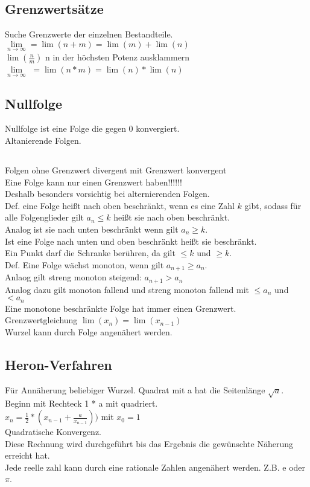 \documentclass{article}
\begin{document}
	\subsection*{Grenzwertsätze}
	Suche Grenzwerte der einzelnen Bestandteile.
	$\lim\limits_{n \to \infty} = \lim(n + m) = \lim(m) + \lim(n)$ \\
	$\lim(\frac{n}{m})$ n in der höchsten Potenz ausklammern \\
	$\lim\limits_{n \to \infty}$ $= \lim(n * m) = \lim(n) * \lim(n)$
	\subsection*{Nullfolge}
	Nullfolge ist eine Folge die gegen $0$ konvergiert. \\
	Altanierende Folgen. \\
	\subsection*{}
	Folgen ohne Grenzwert divergent mit Grenzwert konvergent \\
	Eine Folge kann nur einen Grenzwert haben!!!!!! \\
	Deshalb besonders vorsichtig bei alternierenden Folgen. \\
	Def. eine Folge heißt nach oben beschränkt, wenn es eine Zahl $k$ gibt, sodass für alle Folgenglieder gilt $a_{n} \leq k$ heißt sie nach oben beschränkt. \\ 
	Analog ist sie nach unten beschränkt wenn gilt $a_{n} \geq k$. \\
	 Ist eine Folge nach unten und oben beschränkt heißt sie beschränkt. \\
	Ein Punkt darf die Schranke berühren, da gilt $\leq k$ und $\geq k$. \\
	Def. Eine Folge wächst monoton, wenn gilt $a_{n+1} \geq a_{n}$. \\
	Anlaog gilt streng monoton steigend: $a_{n+1} > a_{n}$ \\
	Analog dazu gilt monoton fallend und streng monoton fallend mit $\leq a_{n}$ und $< a_{n}$ \\
	Eine monotone beschränkte Folge hat immer einen Grenzwert. \\
	Grenzwertgleichung $\lim(x_{n}) = \lim(x_{n-1})$ \\
	Wurzel kann durch Folge angenähert werden. \\
	\subsection*{Heron-Verfahren} 
	Für Annäherung beliebiger Wurzel.
	Quadrat mit a hat die Seitenlänge $\sqrt{a}$.
	Beginn mit Rechteck 1 * a mit quadriert. \\
	$x_{n} = \frac{1}{2}*(x_{n-1} + \frac{a}{x_{n-1}}))$ mit $x_{0} = 1$ \\
	Quadratische Konvergenz. \\
	Diese Rechnung wird durchgeführt bis das Ergebnis die gewünschte Näherung erreicht hat. \\
	Jede reelle zahl kann durch eine rationale Zahlen angenähert werden. Z.B. e oder $\pi$.
	
\end{document}
